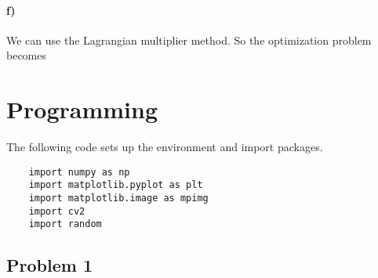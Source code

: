 \documentclass{article}
\begin{document}
\paragraph{f)} We can use the Lagrangian multiplier method. So the optimization problem becomes

\newpage
\section{Programming}
The following code sets up the environment and import packages.
\begin{lstlisting}
	import numpy as np
	import matplotlib.pyplot as plt
	import matplotlib.image as mpimg
	import cv2
	import random
\end{lstlisting}

\subsection*{Problem 1}
%
%
\end{document}
